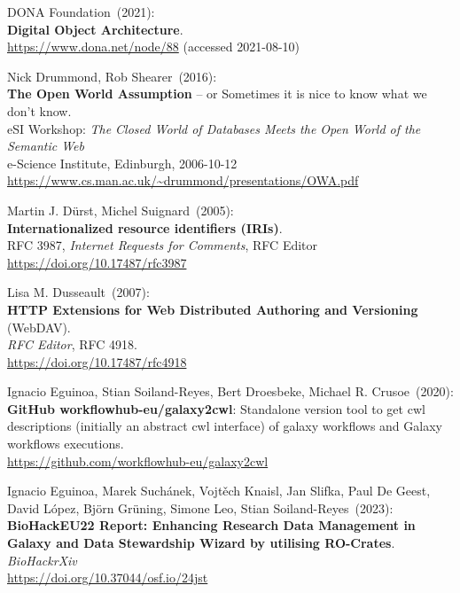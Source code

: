 \begin{thebibliography}{9}
DONA Foundation~(2021): \\
\textbf{Digital Object Architecture}.\\
\url{https://www.dona.net/node/88} (accessed 2021-08-10)

Nick Drummond, Rob Shearer~(2016): \\
\textbf{The Open World Assumption} -- or Sometimes it is nice to know what we don't know.\\
eSI Workshop: \emph{The Closed World of Databases Meets the Open World of the Semantic Web}\\
e-Science Institute, Edinburgh, 2006-10-12\\
\url{https://www.cs.man.ac.uk/~drummond/presentations/OWA.pdf}

Martin J. Dürst, Michel Suignard~(2005): \\
\textbf{Internationalized resource identifiers (IRIs)}.\\
RFC 3987, \emph{Internet Requests for Comments}, RFC Editor\\
\url{https://doi.org/10.17487/rfc3987}

Lisa M. Dusseault~(2007): \\
\textbf{HTTP Extensions for Web Distributed Authoring and Versioning} (WebDAV). \\
\emph{RFC Editor}, RFC 4918.\\
\url{https://doi.org/10.17487/rfc4918}

Ignacio Eguinoa, Stian Soiland-Reyes, Bert Droesbeke, Michael R. Crusoe~(2020): \\
\textbf{GitHub workflowhub-eu/galaxy2cwl}: Standalone version tool to
get cwl descriptions (initially an abstract cwl interface) of galaxy
workflows and Galaxy workflows executions.\\
\url{https://github.com/workflowhub-eu/galaxy2cwl}

Ignacio Eguinoa, Marek Suchánek, Vojtěch Knaisl, Jan Slifka, Paul De Geest, David López, Björn Grüning, Simone Leo, Stian Soiland-Reyes~(2023): \\
\textbf{BioHackEU22 Report: Enhancing Research Data Management in Galaxy and Data Stewardship Wizard by utilising RO-Crates}.\\
\emph{BioHackrXiv}\\
\url{https://doi.org/10.37044/osf.io/24jst}


\end{thebibliography}
